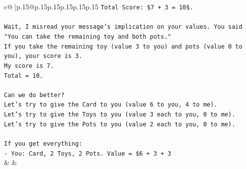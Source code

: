 \documentclass{article}
\begin{document}
{\begin{supertabular}{c@{$\;$}|p{.15\linewidth}@{}p{.15\linewidth}p{.15\linewidth}p{.15\linewidth}p{.15\linewidth}p{.15\linewidth}}
{{{\texttt{Total Score: \$7 + 3 = 10\$.} \\
\\ 
\texttt{Wait, I misread your message's implication on your values. You said "You can take the remaining toy and both pots."} \\
\texttt{If you take the remaining toy (value 3 to you) and pots (value 0 to you), your score is 3.} \\
\texttt{My score is 7.} \\
\texttt{Total = 10.} \\
\\ 
\texttt{Can we do better?} \\
\texttt{Let's try to give the Card to you (value 6 to you, 4 to me).} \\
\texttt{Let's try to give the Toys to you (value 3 each to you, 0 to me).} \\
\texttt{Let's try to give the Pots to you (value 2 each to you, 0 to me).} \\
\\ 
\texttt{If you get everything:} \\
\texttt{{-} You: Card, 2 Toys, 2 Pots. Value = \$6 + 3 + 3} \\
            }
        }
    }
    & & \\ \\


\end{supertabular}}
\end{document}
